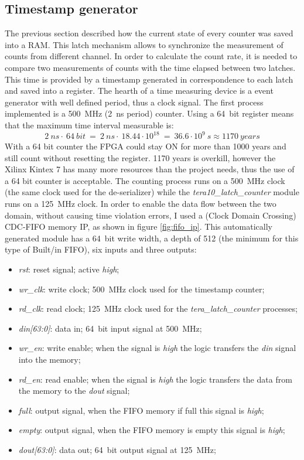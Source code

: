 \subsection{Timestamp generator}\label{Timestamp}
\noindent The previous section described how the current state of every counter was saved into a RAM.
This latch mechanism allows to synchronize the measurement of counts from different channel.
In order to calculate the count rate, it is needed to compare two measurements of counts with the time elapsed between two latches.
This time is provided by a timestamp generated in correspondence to each latch and saved into a register.
The hearth of a time measuring device is a event generator with well defined period, thus a clock signal.
The first process implemented is a 500~MHz (2~ns period) counter.
Using a 64~bit register means that the maximum time interval measurable is:
\begin{equation}
	2 \: ns \cdot \: 64 \: bit \: =\: 2 \: ns \cdot \: 18.44\cdot10^{18} \: = \: 36.6\cdot10^{9} \: s \approx 1170 \: years 
\end{equation}
\noindent With a 64 bit counter the FPGA could stay ON for more than 1000 years and still count without resetting the register. 1170 years is overkill, however the Xilinx Kintex 7 has many more resources than the project needs, thus the use of a 64 bit counter is acceptable.
The counting process runs on a 500~MHz clock (the same clock used for the de-serializer) while the \textit{tera10\_latch\_counter} module runs on a 125~MHz clock. In order to enable the data flow between the two domain, without causing time violation errors, I used a (Clock Domain Crossing) CDC-FIFO memory IP, as shown in figure \ref{fig:fifo_ip}.
This automatically generated module has a 64~bit write width, a depth of 512 (the minimum for this type of Built/in FIFO), six inputs and three outputs:
\begin{itemize}
	\item \textit{rst}: reset signal; active \textit{high};
	\item \textit{wr\_clk}: write clock; 500~MHz clock used for the timestamp counter;
	\item \textit{rd\_clk}: read clock; 125~MHz clock used for the \textit{tera\_latch\_counter} processes;
	\item \textit{din[63:0]}: data in; 64~bit input signal at 500~MHz;
	\item \textit{wr\_en}: write enable; when the signal is \textit{high} the logic transfers the \textit{din} signal into the memory;
	\item \textit{rd\_en}: read enable; when the signal is \textit{high} the logic transfers the data from the memory to the \textit{dout} signal;
	\item \textit{full}: output signal, when the FIFO memory if full this signal is \textit{high};
	\item \textit{empty}: output signal, when the FIFO memory is empty this signal is \textit{high};
	\item \textit{dout[63:0]}: data out; 64~bit output signal at 125~MHz;
\end{itemize}
